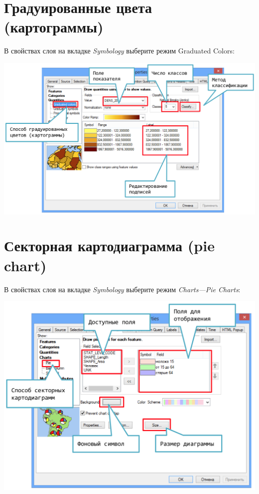 \documentclass[]{book}
\theoremstyle{definition}
\theoremstyle{definition}
\theoremstyle{definition}
\theoremstyle{remark}
\begin{document}
\hypertarget{manual-vector-graduated}{%
\section{Градуированные цвета
(картограммы)}\label{manual-vector-graduated}}

В свойствах слоя на вкладке \emph{Symbology} выберите режим Graduated
Colors:

\includegraphics{images/Appendix/image21.png}

\hypertarget{manual-vector-pie}{%
\section{Секторная картодиаграмма (pie chart)}\label{manual-vector-pie}}

В свойствах слоя на вкладке \emph{Symbology} выберите режим
\emph{Charts---Pie Charts}:

\includegraphics{images/Appendix/image22.png}
\end{document}
